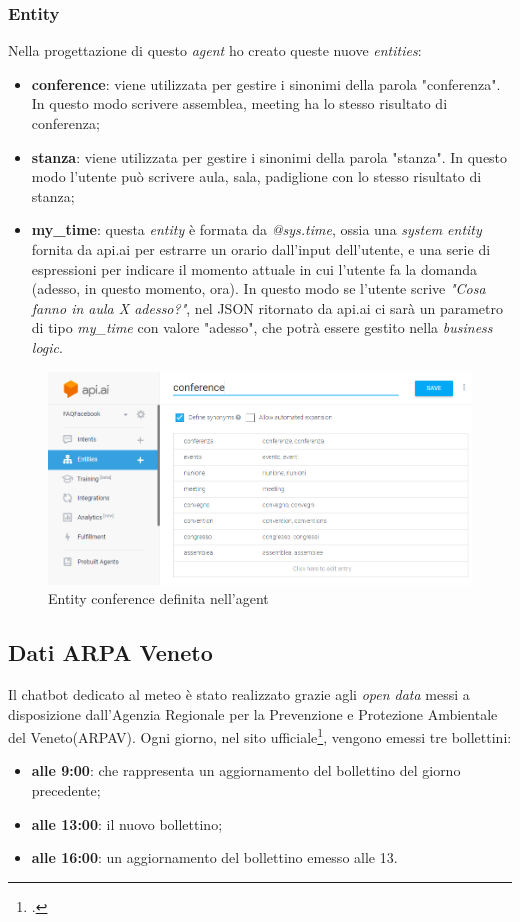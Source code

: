 \subsubsection{Entity}
Nella progettazione di questo \emph{agent} ho creato queste nuove \emph{entities}:
\begin{itemize}
	\item \textbf{conference}: viene utilizzata per gestire i sinonimi della parola "conferenza". In questo modo scrivere assemblea, meeting ha lo stesso risultato di conferenza;
	\item \textbf{stanza}: viene utilizzata per gestire i sinonimi della parola "stanza". In questo modo l'utente può scrivere aula, sala, padiglione con lo stesso risultato di stanza;
	\item \textbf{my\_time}: questa \emph{entity} è formata da \emph{@sys.time}, ossia una \emph{system entity} fornita da api.ai per estrarre un orario dall'input dell'utente, e una serie di espressioni per indicare il momento attuale in cui l'utente fa la domanda (adesso, in questo momento, ora). In questo modo se l'utente scrive \emph{"Cosa fanno in aula X adesso?"}, nel \gls{JSON} ritornato da api.ai ci sarà un parametro di tipo \emph{my\_time} con valore "adesso", che potrà essere gestito nella \emph{business logic}.
\end{itemize}

\begin{figure}[h!]
	\centering
	\includegraphics[scale=0.5]{../Immagini/conference.png}
	\caption{Entity conference definita nell'agent}
\end{figure}

\subsection{Dati ARPA Veneto}
Il \gls{chatbot} dedicato al meteo è stato realizzato grazie agli \emph{open data} messi a disposizione dall'Agenzia Regionale per la Prevenzione e Protezione Ambientale del Veneto(ARPAV). Ogni giorno, nel sito ufficiale\footcite{arpav}, vengono emessi tre bollettini:
\begin{itemize}
	\item \textbf{alle 9:00}: che rappresenta un aggiornamento del bollettino del giorno precedente;
	\item \textbf{alle 13:00}: il nuovo bollettino;
	\item \textbf{alle 16:00}: un aggiornamento del bollettino emesso alle 13.
\end{itemize} 

